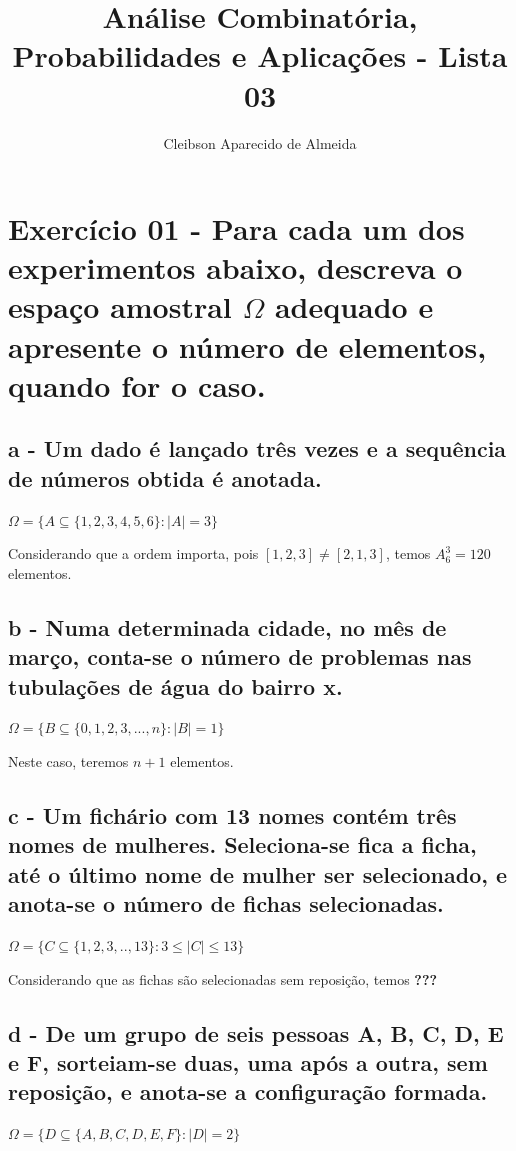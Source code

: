 \documentclass[12pt]{article}
\title{Análise Combinatória, Probabilidades e Aplicações - Lista 03}
\author{{Cleibson Aparecido de Almeida}}
\begin{document}
\maketitle

\section*{Exercício 01 - Para cada um dos experimentos abaixo, descreva o espaço amostral $\Omega$ adequado e apresente o número de elementos, quando for o caso.}


\subsection*{a - Um dado é lançado três vezes e a sequência de números obtida é anotada.}

$\Omega = \{A \subseteq \{1,2,3,4,5,6\}: |A|=3\}$

Considerando que a ordem importa, pois $[1,2,3] \neq [2,1,3]$, temos $A_6^3=120$ elementos.

\subsection*{b - Numa determinada cidade, no mês de março, conta-se o número de problemas nas tubulações de água do bairro x.}

$\Omega = \{B \subseteq \{0,1,2,3,...,n\}: |B|=1\}$

Neste caso, teremos $n+1$ elementos.

\subsection*{c  - Um fichário com 13 nomes contém três nomes de mulheres. Seleciona-se fica a ficha, até o último nome de mulher ser selecionado, e anota-se o número de fichas selecionadas.}

$\Omega = \{C \subseteq \{1,2,3,..,13\}: 3 \leq |C| \leq 13\}$

Considerando que as fichas são selecionadas sem reposição, temos \textbf{???}

\subsection*{d - De um grupo de seis pessoas A, B, C, D, E e F, sorteiam-se duas, uma após a outra, sem reposição, e anota-se a configuração formada.}

$\Omega = \{D \subseteq \{A,B,C,D,E,F\}: |D|=2\}$
\end{document}
